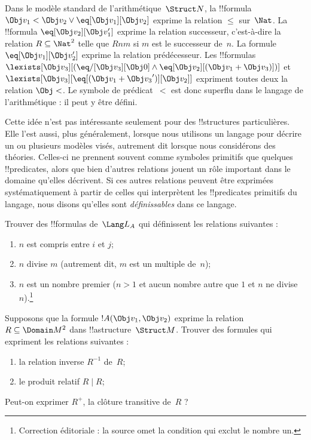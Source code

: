\documentclass[../../../include/open-logic-section]{subfiles}
\begin{document}
\begin{ex}
Dans le modèle standard de l'arithmétique~$\Struct N$, la
!!{formula} $\Obj v_1 < \Obj v_2 \lor \eq[\Obj v_1][\Obj v_2]$
exprime la relation $\le$ sur~$\Nat$. La !!{formula}
$\eq[\Obj v_2][\Obj v_1']$ exprime la relation successeur,
c'est-à-dire la relation $R \subseteq \Nat^2$ telle que $Rnm$ si
$m$ est le successeur de~$n$. La formule
$\eq[\Obj v_1][\Obj v_2']$ exprime la relation prédécesseur.
Les !!{formula}s
$\lexists[\Obj v_3][(\eq/[\Obj v_3][\Obj 0] \land
  \eq[\Obj v_2][(\Obj v_1 + \Obj v_3)])]$ et
$\lexists[\Obj v_3][\eq[(\Obj v_1 + {\Obj v_3}')][\Obj v_2]]$
expriment toutes deux la relation $\Obj <$.
Le symbole de prédicat~$<$ est donc superflu dans le langage de
l'arithmétique : il peut y être défini.
\end{ex}

\begin{explain}
Cette idée n'est pas intéressante seulement pour des !!{structure}s
particulières. Elle l'est aussi, plus généralement, lorsque nous
utilisons un langage pour décrire un ou plusieurs modèles visés,
autrement dit lorsque nous considérons des théories. Celles-ci ne
prennent souvent comme symboles primitifs que quelques
!!{predicate}s, alors que bien d'autres relations jouent un rôle
important dans le domaine qu'elles décrivent. Si ces autres
relations peuvent être exprimées systématiquement à partir de celles
qui interprètent les !!{predicate}s primitifs du langage, nous
disons qu'elles sont \emph{définissables} dans ce langage.
\end{explain}

\begin{prob}
Trouver des !!{formula}s de~$\Lang L_A$ qui définissent les
relations suivantes :
\begin{enumerate}
\item $n$ est compris entre $i$ et $j$;
\item $n$ divise $m$ (autrement dit, $m$ est un multiple de~$n$);
\item $n$ est un nombre premier ($n>1$ et aucun nombre autre que $1$ et $n$
  ne divise~$n$).\footnote{Correction éditoriale : la source omet la condition qui exclut le nombre un.}
\end{enumerate}
\end{prob}

\begin{prob}
Supposons que la formule $!A(\Obj v_1, \Obj v_2)$ exprime la
relation $R \subseteq \Domain M^2$ dans !!a{structure}~$\Struct M$.
Trouver des formules qui expriment les relations suivantes :
\begin{enumerate}
\item la relation inverse $R^{-1}$ de~$R$;
\item le produit relatif $R \mid R$;
\end{enumerate}
Peut-on exprimer $R^+$, la clôture transitive de~$R$ ?
\end{prob}
\end{document}

